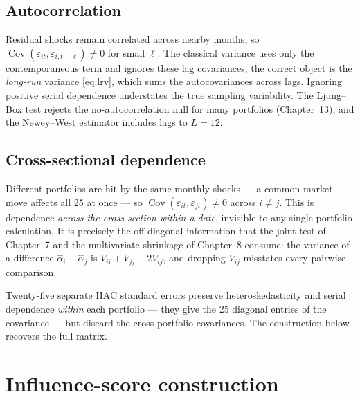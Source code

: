 \hypertarget{autocorrelation}{%
\subsection{Autocorrelation}\label{autocorrelation}}

Residual shocks remain correlated across nearby months, so
$\operatorname{Cov}(\varepsilon_{it},\varepsilon_{i,t-\ell})\neq 0$ for
small $\ell$. The classical variance uses only the contemporaneous term and
ignores these lag covariances; the correct object is the \emph{long-run}
variance \eqref{eq:lrv}, which sums the autocovariances across lags. Ignoring
positive serial dependence understates the true sampling variability. The
Ljung--Box test rejects the no-autocorrelation null for many portfolios
(Chapter~13), and the Newey--West estimator includes lags to $L=12$.

\hypertarget{cross-sectional-dependence}{%
\subsection{Cross-sectional
dependence}\label{cross-sectional-dependence}}

Different portfolios are hit by the same monthly shocks --- a common market
move affects all 25 at once --- so
$\operatorname{Cov}(\varepsilon_{it},\varepsilon_{jt})\neq 0$ across $i\neq j$.
This is dependence \emph{across the cross-section within a date}, invisible
to any single-portfolio calculation. It is precisely the off-diagonal
information that the joint test of Chapter~7 and the multivariate shrinkage
of Chapter~8 consume: the variance of a difference
$\hat\alpha_i-\hat\alpha_j$ is $V_{ii}+V_{jj}-2V_{ij}$, and dropping $V_{ij}$
misstates every pairwise comparison.

Twenty-five separate HAC standard errors preserve heteroskedasticity and
serial dependence \emph{within} each portfolio --- they give the 25 diagonal
entries of the covariance --- but discard the cross-portfolio covariances.
The construction below recovers the full matrix.

\hypertarget{influence-score-construction}{%
\section{Influence-score
construction}\label{influence-score-construction}}

